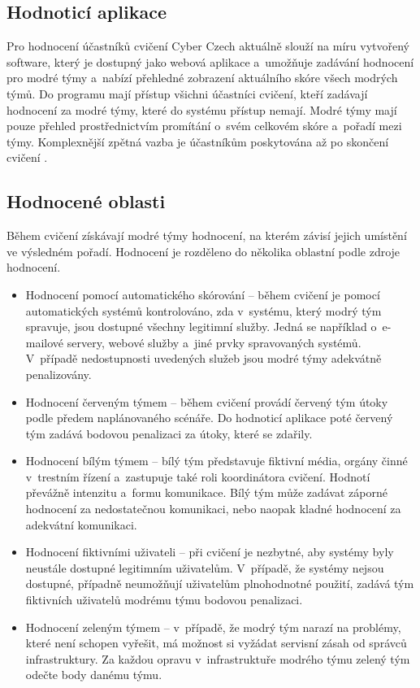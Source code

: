 \documentclass[
  digital,
  twoside,
  table, 
  nolof, 
  nolot
]{fithesis3}
\begin{document}
\subsection{Hodnoticí aplikace}
Pro hodnocení účastníků cvičení Cyber Czech aktuálně slouží na míru vytvořený software, který je dostupný jako webová aplikace a~umožňuje zadávání hodnocení pro modré týmy a~nabízí přehledné zobrazení aktuálního skóre všech modrých týmů. Do programu mají přístup všichni účastníci cvičení, kteří zadávají hodnocení za modré týmy, které do systému přístup nemají. Modré týmy mají pouze přehled prostřednictvím promítání o~svém celkovém skóre a~pořadí mezi týmy. Komplexnější zpětná vazba je účastníkům poskytována až po skončení cvičení \cite{Vykopal2017TimelyExercises}.

\subsection{Hodnocené oblasti}
Během cvičení získávají modré týmy hodnocení, na kterém závisí jejich umístění ve výsledném pořadí. Hodnocení je rozděleno do několika oblastní podle zdroje hodnocení.

\begin{itemize}
\item Hodnocení pomocí automatického skórování -- během cvičení je pomocí automatických systémů kontrolováno, zda v~systému, který modrý tým spravuje, jsou dostupné všechny legitimní služby. Jedná se například o~e-mailové servery, webové služby a~jiné prvky spravovaných systémů. V~případě nedostupnosti uvedených služeb jsou modré týmy adekvátně penalizovány.
\item Hodnocení červeným týmem -- během cvičení provádí červený tým útoky podle předem naplánovaného scénáře. Do hodnoticí aplikace poté červený tým zadává bodovou penalizaci za útoky, které se zdařily.
\item Hodnocení bílým týmem -- bílý tým představuje fiktivní média, orgány činné v~trestním řízení a~zastupuje také roli koordinátora cvičení. Hodnotí převážně intenzitu a~formu komunikace. Bílý tým může zadávat záporné hodnocení za nedostatečnou komunikaci, nebo naopak kladné hodnocení za adekvátní komunikaci.
\item Hodnocení fiktivními uživateli -- při cvičení je nezbytné, aby systémy byly neustále dostupné legitimním uživatelům. V~případě, že systémy nejsou dostupné, případně neumožňují uživatelům plnohodnotné použití, zadává tým fiktivních uživatelů modrému týmu bodovou penalizaci.
\item Hodnocení zeleným týmem -- v~případě, že modrý tým narazí na problémy, které není schopen vyřešit, má možnost si vyžádat servisní zásah od správců infrastruktury. Za každou opravu v~infrastruktuře modrého týmu zelený tým odečte body danému týmu.
\end{itemize}
\end{document}
